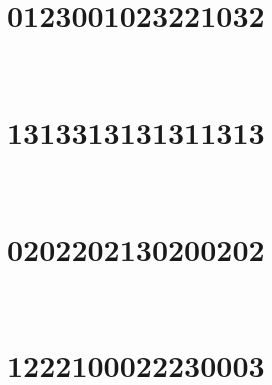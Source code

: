 
\section{0123001023221032}

\marginnote[3\baselineskip]{\centering}



\,
\newline
\vspace{1.2cm}

\section{1313313131311313}

\marginnote[3\baselineskip]{\centering}



\,
\newline
\vspace{1.2cm}

\section{0202202130200202}

\marginnote[3\baselineskip]{\centering}



\,
\newline
\vspace{1.2cm}

\section{1222100022230003}

\marginnote[3\baselineskip]{\centering}



\,
\newline
\vspace{1.2cm}

